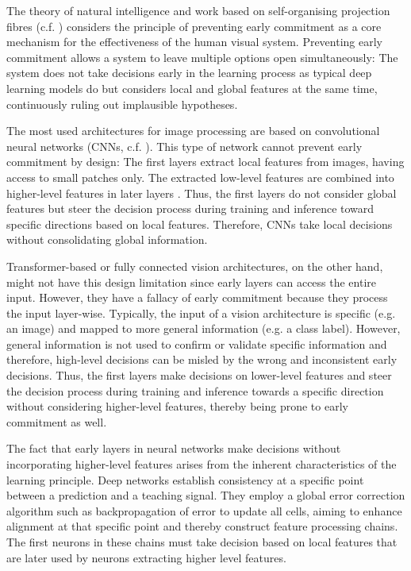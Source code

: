 The theory of natural intelligence  and work based on self-organising projection fibres (c.f. ) considers the principle of preventing early commitment as a core mechanism for the effectiveness of the human visual system.
Preventing early commitment allows a system to leave multiple options open simultaneously: The system does not take decisions early in the learning process as typical deep learning models do but considers local and global features at the same time, continuously ruling out implausible hypotheses.

The most used architectures for image processing are based on convolutional neural networks (CNNs, c.f. ). This type of network cannot prevent early commitment by design: The first layers extract local features from images, having access to small patches only. The extracted low-level features are combined into higher-level features in later layers . Thus, the first layers do not consider global features but steer the decision process during training and inference toward specific directions based on local features. Therefore, CNNs take local decisions without consolidating global information.

Transformer-based  or fully connected  vision architectures, on the other hand, might not have this design limitation since early layers can access the entire input.
However, they have a fallacy of early commitment because they process the input layer-wise. Typically, the input of a vision architecture is specific (e.g. an image) and mapped to more general information (e.g. a class label).
However, general information is not used to confirm or validate specific information and therefore, high-level decisions can be misled by the wrong and inconsistent early decisions.
Thus, the first layers make decisions on lower-level features and steer the decision process during training and inference towards a specific direction without considering higher-level features, thereby being prone to early commitment as well.

The fact that early layers in neural networks make decisions without incorporating higher-level features arises from the inherent characteristics of the learning principle.
Deep networks establish consistency at a specific point between a prediction and a teaching signal.
They employ a global error correction algorithm such as backpropagation of error  to update all cells, aiming to enhance alignment at that specific point and thereby construct feature processing chains.
The first neurons in these chains must take decision based on local features that are later used by neurons extracting higher level features.

